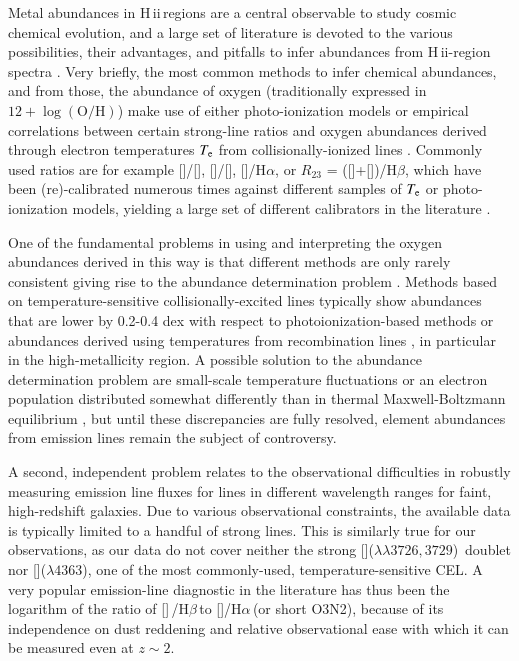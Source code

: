 \documentclass[traditabstract]{aa}
\newcommand{\hb}{H$\beta$}
\newcommand{\ha}{H$\alpha$}
\newcommand{\hii}{\mbox{H\,{\sc ii}}}
\newcommand{\oh}{$12+\log(\mathrm{O/H})$}
\newcommand{\oii}{[\ion{O}{ii}]}
\newcommand{\oiii}{[\ion{O}{iii}]}
\newcommand{\nii}{[\ion{N}{ii}]}
\begin{document}
Metal abundances in \hii\,regions are a central observable to study cosmic chemical evolution, and a large set of literature is devoted to the various possibilities, their advantages, and pitfalls to infer abundances from \hii-region spectra  \citep[e.g.,][]{1979MNRAS.189...95P, 1991ApJ...380..140M, 2005ApJ...631..231P, 2008ApJ...681.1183K}. Very briefly, the most common methods to infer chemical abundances, and from those, the abundance of oxygen (traditionally expressed in \oh) make use of either photo-ionization models \citep[e.g.,][]{1985ApJS...58..125E, 2000ApJ...542..224D, 2002ApJS..142...35K} or empirical correlations between certain strong-line ratios and oxygen abundances derived through electron temperatures $T_{\rm{e}}$ from collisionally-ionized lines \citep[CELs, e.g.,][]{2004MNRAS.348L..59P, 2013A&A...559A.114M}. Commonly used ratios are for example \nii/\oii, \oiii/\nii, \nii/\ha, or $R_{23}$ = (\oii+\oiii)/\hb, which have been (re)-calibrated numerous times against different samples of $T_{\rm{e}}$ or photo-ionization models, yielding a large set of different calibrators in the literature \citep[e.g.,][]{2002ApJS..142...35K, 2004ApJ...617..240K, 2005ApJ...631..231P, 2006A&A...459...85N, 2008A&A...488..463M}.

One of the fundamental problems in using and interpreting the oxygen abundances derived in this way is that different methods are only rarely consistent \citep[e.g.,][]{2008ApJ...681.1183K} giving rise to the abundance determination problem \citep{1967ApJ...150..825P}. Methods based on temperature-sensitive collisionally-excited lines typically show abundances that are lower by 0.2-0.4 dex with respect to photoionization-based methods or abundances derived using temperatures from recombination lines \citep[e.g.,][and references therein]{2012MNRAS.426.2630L}, in particular in the high-metallicity region. A possible solution to the abundance determination problem are small-scale temperature fluctuations \citep[e.g.,][]{2003ApJ...584..735P, 2004MNRAS.355..229E} or an electron population distributed somewhat differently than in thermal Maxwell-Boltzmann equilibrium \citep{2012ApJ...752..148N, 2012MNRAS.426.2630L}, but until these discrepancies are fully resolved, element abundances from emission lines remain the subject of controversy.

A second, independent problem relates to the observational difficulties in robustly measuring emission line fluxes for lines in different wavelength ranges for faint, high-redshift galaxies. Due to various observational constraints, the available data is typically limited to a handful of strong lines. This is similarly true for our observations, as our data do not cover neither the strong \oii($\lambda\lambda3726,3729$)~doublet nor \oiii($\lambda 4363$), one of the most commonly-used, temperature-sensitive CEL. A very popular emission-line diagnostic in the literature has thus been the logarithm of the ratio of \oiii\,/\hb\,to \nii/\ha\,(or short O3N2), because of its independence on dust reddening and relative observational ease with which it can be measured even at $z\sim 2$.
\end{document}
